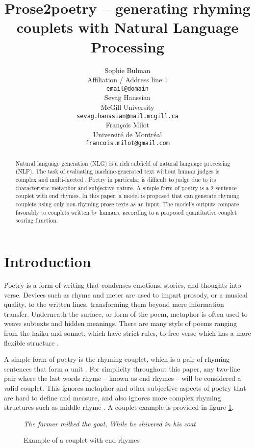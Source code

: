 \documentclass[11pt,a4paper]{article}
\title{Prose2poetry -- generating rhyming couplets with Natural Language Processing}
\author{Sophie Bulman \\
  Affiliation / Address line 1 \\
  \texttt{email@domain} \\\And
  Sevag Hanssian \\
  McGill University \\
  \texttt{sevag.hanssian@mail.mcgill.ca} \\\AND
  François Milot \\
  Université de Montréal \\
  \texttt{francois.milot@gmail.com} \\}
\date{}
\begin{document}
\maketitle
\begin{abstract}
	Natural language generation (NLG) is a rich subfield of natural language processing (NLP). The task of evaluating machine-generated text without human judges is complex and multi-faceted \cite{nlgeval}. Poetry in particular is difficult to judge due to its characteristic metaphor and subjective nature. A simple form of poetry is a 2-sentence couplet with end rhymes. In this paper, a model is proposed that can generate rhyming couplets using only non-rhyming prose texts as an input. The model's outputs compare favorably to couplets written by humans, according to a proposed quantitative couplet scoring function.
\end{abstract}

\section{Introduction}
\label{sec:intro}

Poetry is a form of writing that condenses emotions, stories, and thoughts into verse. Devices such as rhyme and meter are used to impart prosody, or a musical quality, to the written lines, transforming them beyond mere information transfer. Underneath the surface, or form of the poem, metaphor is often used to weave subtexts and hidden meanings. There are many style of poems ranging from the haiku and sonnet, which have strict rules, to free verse which has a more flexible structure \citep{poem_type}.

A simple form of poetry is the rhyming couplet, which is a pair of rhyming sentences that form a unit \cite{couplet_def}. For simplicity throughout this paper, any two-line pair where the last words rhyme -- known as end rhymes \cite{end_rhyme_def} -- will be considered a valid couplet. This ignores metaphor and other subjective aspects of poetry that are hard to define and measure, and also ignores more complex rhyming structures such as middle rhyme \cite{internal_rhyme_def}. A couplet example is provided in figure \ref{fig:couplet_example}.

\begin{figure}
	\textit{The farmer milked the goat,} \newline
	\textit{While he shivered in his coat}
\caption{Example of a couplet with end rhymes}
\label{fig:couplet_example}
\end{figure}
\end{document}
